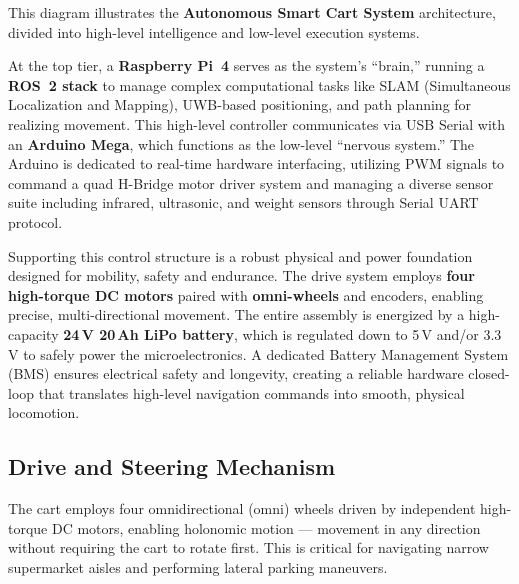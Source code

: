 This diagram illustrates the \textbf{Autonomous Smart Cart System}
architecture, divided into high-level intelligence and low-level
execution systems.

At the top tier, a \textbf{Raspberry Pi~4} serves as the system's
``brain,'' running a \textbf{ROS~2 stack} to manage complex
computational tasks like SLAM (Simultaneous Localization and Mapping),
UWB-based positioning, and path planning for realizing movement. This
high-level controller communicates via USB Serial with an
\textbf{Arduino Mega}, which functions as the low-level ``nervous
system.'' The Arduino is dedicated to real-time hardware interfacing,
utilizing PWM signals to command a quad H-Bridge motor driver system and
managing a diverse sensor suite including infrared, ultrasonic, and
weight sensors through Serial UART protocol.

Supporting this control structure is a robust physical and power
foundation designed for mobility, safety and endurance. The drive system
employs \textbf{four high-torque DC motors} paired with
\textbf{omni-wheels} and encoders, enabling precise, multi-directional
movement. The entire assembly is energized by a high-capacity
\textbf{24\,V 20\,Ah LiPo battery}, which is regulated down to 5\,V
and/or 3.3\,V to safely power the microelectronics. A dedicated Battery
Management System (BMS) ensures electrical safety and longevity, creating
a reliable hardware closed-loop that translates high-level navigation
commands into smooth, physical locomotion.

\subsection{Drive and Steering Mechanism}

The cart employs four omnidirectional (omni) wheels driven by
independent high-torque DC motors, enabling holonomic motion ---
movement in any direction without requiring the cart to rotate first.
This is critical for navigating narrow supermarket aisles and performing
lateral parking maneuvers.

